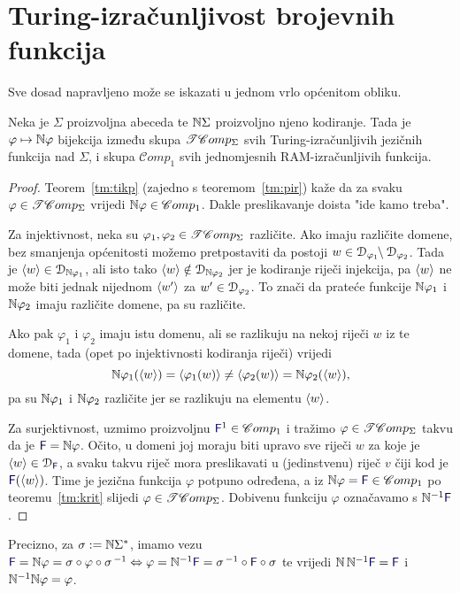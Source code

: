 \section{Turing-izračunljivost brojevnih funkcija}


Sve dosad napravljeno može se iskazati u jednom vrlo općenitom obliku.

\begin{propozicija}[{name=[izomorfizam skupova $\TComp$ i $\mathscr Comp_1$]}]\label{pp:trackbij}
Neka je $\Sigma$ proizvoljna abeceda te ${\mathbb N}\Sigma$ proizvoljno njeno kodiranje. Tada je $\varphi\mapsto{\mathbb N}\varphi$ bijekcija između skupa $\TComp$ svih Turing-izračunljivih jezičnih funkcija nad $\Sigma$, i skupa $\mathscr Comp_1$ svih jednomjesnih RAM-izračunljivih funkcija.
\end{propozicija}

\begin{proof}
Teorem~\ref{tm:tikp} (zajedno s teoremom~\ref{tm:pir}) kaže da za svaku $\varphi\in\mathscr{TC}omp_\Sigma$ vrijedi ${\mathbb N}\varphi\in\mathscr Comp_1$. Dakle preslikavanje doista "ide kamo treba".

Za injektivnost, neka su $\varphi_1,\varphi_2\in\mathscr{TC}omp_\Sigma$ različite. Ako imaju različite domene, bez smanjenja općenitosti možemo pretpostaviti da postoji $w\in\mathcal D_{\varphi_1}\!\!\setminus\mathcal D_{\varphi_2}$. Tada je $\langle w\rangle\in\mathcal D_{{\mathbb N}\varphi_1}$, ali isto tako $\langle w\rangle\notin\mathcal D_{{\mathbb N}\varphi_2}$ jer je kodiranje riječi injekcija, pa $\langle w\rangle$ ne može biti jednak nijednom $\langle w'\rangle$ za $w'\in\mathcal D_{\varphi_2}$. To znači da prateće funkcije ${\mathbb N}\varphi_1$ i ${\mathbb N}\varphi_2$ imaju različite domene, pa su različite.

Ako pak $\varphi_1$ i $\varphi_2$ imaju istu domenu, ali se razlikuju na nekoj riječi $w$ iz te domene, tada (opet po injektivnosti kodiranja riječi) vrijedi
\begin{equation}
    {\mathbb N}\varphi_1(\langle w\rangle)=\langle\varphi_1(w)\rangle\ne\langle\varphi_2(w)\rangle={\mathbb N}\varphi_2(\langle w\rangle)\text,
\end{equation}
pa su ${\mathbb N}\varphi_1$ i ${\mathbb N}\varphi_2$ različite jer se razlikuju na elementu $\langle w\rangle$.

Za surjektivnost, uzmimo proizvoljnu $\f F^1\in\mathscr Comp_1$ i tražimo $\varphi\in\mathscr{TC}omp_\Sigma$ takvu da je $\f F=\N\varphi$. Očito, u domeni joj moraju biti upravo sve riječi $w$ za koje je $\kr w\in\dom{\f F}$, a svaku takvu riječ mora preslikavati u (jedinstvenu) riječ $v$ čiji kod je $\f F(\kr w)$. Time je jezična funkcija $\varphi$ potpuno određena, a iz $\N\varphi=\f F\in\mathscr Comp_1$ po teoremu~\ref{tm:krit} slijedi $\varphi\in\mathscr{TC}omp_\Sigma$. Dobivenu funkciju $\varphi$ označavamo s $\N^{-1}\f F$.
\end{proof}
Precizno, za $\sigma:={\mathbb N}\Sigma^*$, imamo vezu
	$\f F=\N\varphi=\sigma\circ\varphi\circ\sigma^{\,-1}\Leftrightarrow
	\varphi=\N^{-1}\f F=\sigma^{\,-1}\circ\f F\circ\sigma$
te vrijedi $\N\,\N^{-1}\f F=\f F$ i ${\mathbb N}^{-1}{\mathbb N}\varphi=\varphi$.

